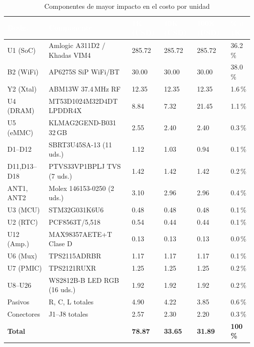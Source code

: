 \begin{table}[H]
  \centering
  \caption{Componentes de mayor impacto en el costo por unidad}
  \label{tab:cost_subsistemas}
  \small
  \begin{tabular}{L{2.5cm} L{3.0cm} R{1.6cm} R{1.6cm} R{1.6cm} R{1.4cm}}
    \toprule
    \textcolor{white}{\textbf{Desig.}} &
    \textcolor{white}{\textbf{Componente}} &
    \textcolor{white}{\textbf{1K (USD)}} &
    \textcolor{white}{\textbf{10K (USD)}} &
    \textcolor{white}{\textbf{100K (USD)}} &
    \textcolor{white}{\textbf{\% a 1K}} \\
    \midrule
    U1 (SoC)   & Amlogic A311D2 / Khadas VIM4 & 285.72 & 285.72 & 285.72 & 36.2\,\% \\
    B2 (WiFi)  & AP6275S SiP WiFi/BT          &  30.00 &  30.00 &  30.00 & 38.0\,\% \\
    Y2 (Xtal)  & ABM13W 37.4\,MHz RF           &  12.35 &  12.35 &  12.35 &  1.6\,\% \\
    U4 (DRAM)  & MT53D1024M32D4DT LPDDR4X     &   8.84 &   7.32 &  21.45 &  1.1\,\% \\
    U5 (eMMC)  & KLMAG2GEND-B031 32\,GB        &   2.55 &   2.40 &   2.40 &  0.3\,\% \\
    D1--D12    & SBRT3U45SA-13 (11 uds.)       &   1.12 &   1.03 &   0.94 &  0.1\,\% \\
    D11,D13--D18 & PTVS33VP1BPLJ TVS (7 uds.) &   1.42 &   1.42 &   1.42 &  0.2\,\% \\
    ANT1, ANT2 & Molex 146153-0250 (2 uds.)   &   3.10 &   2.96 &   2.96 &  0.4\,\% \\
    U3 (MCU)   & STM32G031K6U6                 &   0.48 &   0.48 &   0.48 &  0.1\,\% \\
    U2 (RTC)   & PCF8563T/5,518               &   0.54 &   0.44 &   0.44 &  0.1\,\% \\
    U12 (Amp.) & MAX98357AETE+T Clase D        &   0.13 &   0.13 &   0.13 &  0.0\,\% \\
    U6 (Mux)   & TPS2115ADRBR                  &   1.17 &   1.17 &   1.17 &  0.1\,\% \\
    U7 (PMIC)  & TPS2121RUXR                   &   1.25 &   1.25 &   1.25 &  0.2\,\% \\
    U8--U26    & WS2812B-B LED RGB (16 uds.)   &   1.92 &   1.92 &   1.92 &  0.2\,\% \\
    Pasivos    & R, C, L totales               &   4.90 &   4.22 &   3.85 &  0.6\,\% \\
    Conectores & J1--J8 totales                &   2.57 &   2.30 &   2.20 &  0.3\,\% \\
    \midrule
    \textbf{Total} & & \textbf{78.87} & \textbf{33.65} & \textbf{31.89} & \textbf{100\,\%} \\
    \bottomrule
  \end{tabular}
\end{table}

